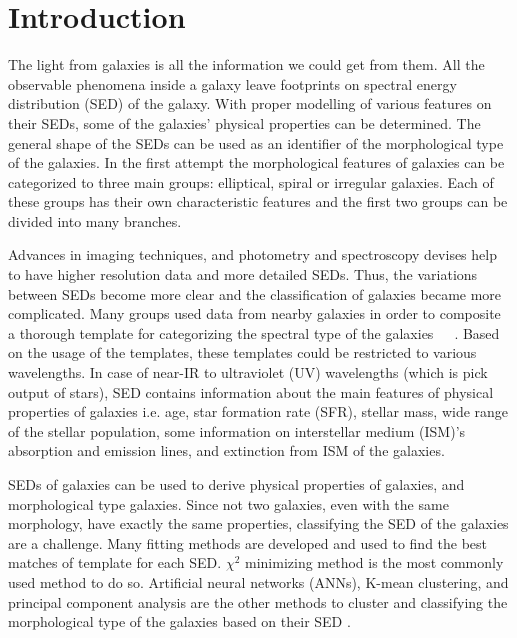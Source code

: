 \section{Introduction}
\label{sec: intro}
The light from galaxies is all the information we could get from them. 
All the observable phenomena inside a galaxy leave footprints on spectral energy distribution (SED) of the galaxy.
With proper modelling of various features on their SEDs, some of the galaxies' physical properties can be determined.
The general shape of the SEDs can be used as an identifier of the morphological type of the galaxies.
In the first attempt the morphological features of galaxies can be categorized to three main groups: elliptical, spiral or irregular galaxies.
Each of these groups has their own characteristic features and the first two groups can be divided into many branches.

Advances in imaging techniques, and photometry and spectroscopy devises help to have higher resolution data and more detailed SEDs. 
Thus, the variations between SEDs become more clear and the classification of galaxies became more complicated.
Many groups used data from nearby galaxies in order to composite a thorough template for categorizing the spectral type of the galaxies~\citep[e.g.][]{Kinney93}~\citep[][hereafter K96]{Kinney96}~\citep[][]{Bershady00,Mannucci01}.
Based on the usage of the templates, these templates could be restricted to various wavelengths.
In case of near-IR to ultraviolet (UV) wavelengths (which is pick output of stars), SED contains information about the main features of physical properties of galaxies i.e. age, star formation rate (SFR), stellar mass, wide range of the stellar population, some information on interstellar medium (ISM)'s absorption and emission lines, and extinction from ISM of the galaxies.

SEDs of galaxies can be used to derive physical properties of galaxies, and morphological type galaxies.
Since not two galaxies, even with the same morphology, have exactly the same properties, classifying the SED of the galaxies are a challenge.
Many fitting methods are developed and used to find the best matches of template for each SED.
$\chi^2$ minimizing method is the most commonly used method to do so. 
Artificial neural networks (ANNs), K-mean clustering, and principal component analysis are the other methods to cluster and classifying the morphological type of the galaxies based on their SED \citep[e.g.][]{Allen13,Ordov14,Shi15}.

